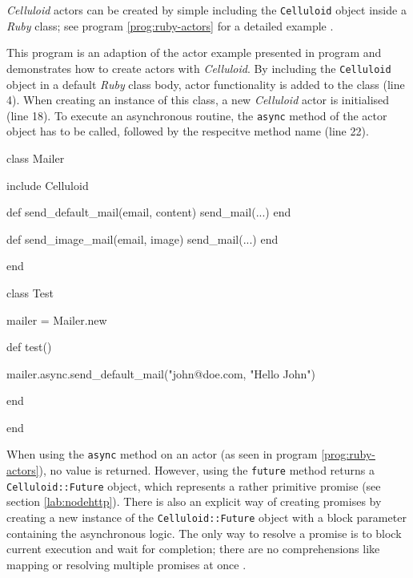 \textit{Celluloid} actors can be created by simple including the \texttt{Celluloid} object inside a \textit{Ruby} class; see program \ref{prog:ruby-actors} for a detailed example \cite{Storimer2013}.
\begin{program}
  \caption{This program is an adaption of the actor example presented in program \label{prog:scala-actors} and demonstrates how to create actors with \textit{Celluloid}. By including the \texttt{Celluloid} object in a default \textit{Ruby} class body, actor functionality is added to the class (line 4). When creating an instance of this class, a new \textit{Celluloid} actor is initialised (line 18). To execute an asynchronous routine, the \texttt{async} method of the actor object has to be called, followed by the respecitve method name (line 22).}
  \label{prog:ruby-actors}
  \begin{JavaCode}

class Mailer
    
    include Celluloid

    def send_default_mail(email, content)
        send_mail(...)
    end

    def send_image_mail(email, image)
	    send_mail(...)
    end

end

class Test

    mailer = Mailer.new

    def test()
    
        mailer.async.send_default_mail("john@doe.com, "Hello John")

    end   

end
  \end{JavaCode}
\end{program}
When using the \texttt{async} method on an actor (as seen in program \ref{prog:ruby-actors}), no value is returned. However, using the \texttt{future} method returns a \texttt{Celluloid::Future} object, which represents a rather primitive promise (see section \ref{lab:nodehttp}). There is also an explicit way of creating promises by creating a new instance of the \texttt{Celluloid::Future} object with a block parameter containing the asynchronous logic. The only way to resolve a promise is to block current execution and wait for completion; there are no comprehensions like mapping or resolving multiple promises at once \cite{Arcieri2012}.

